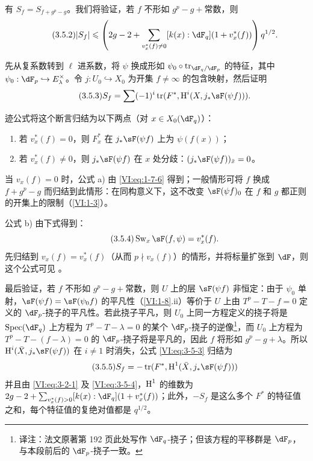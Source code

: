 有 $S_f=S_{f+g^p-g}$。我们将验证，若 $f$ 不形如 $g^p-g+\text{常数}$，则
\begin{equation*}\tag{3.5.2}\label{VI:eq:3-5-2}
  |S_f|\leqslant \left(2 g-2+\sum_{v_x^\ast(f)\ne 0} [k(x):\dF_q] (1+v_x^\ast(f))\right) q^{1/2} \text{.}
\end{equation*}

先从复系数转到 $\ell$ 进系数，将 $\psi$ 换成形如 $\psi_0\circ \tr_{\dF_q/\dF_p}$ 的特征，其中 $\psi_0:\dF_p\hookrightarrow E_\lambda^\times$。令 $j:U_0\hookrightarrow X_0$ 为开集 $f\ne\infty$ 的包含映射，然后证明
\begin{equation*}\tag{3.5.3}\label{VI:eq:3-5-3}
  S_f = \sum (-1)^i \tr(F^\ast,\h^i(X,j_\ast \sF(\psi f))) \text{.}
\end{equation*}

迹公式将这个断言归结为以下两点（对 $x\in X_0(\dF_q)$）：
\begin{enumerate}[\indent a)]
  \item 若 $v_x^\ast(f)=0$，则 $F_x^\ast$ 在 $j_\ast \sF(\psi f)$ 上为 $\psi(f(x))$；
  \item 若 $v_x^\ast(f)\ne 0$，则 $j_\ast \sF(\psi f)$ 在 $x$ 处分歧：$(j_\ast \sF(\psi f))_{\bar x}=0$。
\end{enumerate}

当 $v_x(f)=0$ 时，公式 a) 由 \eqref{VI:eq:1-7-6} 得到；一般情形可将 $f$ 换成 $f+g^p-g$ 而归结到此情形：在同构意义下，这不改变 $\sF(\psi f)_0$ 在 $f$ 和 $g$ 都正则的开集上的限制（\ref{VI:1-3}）。

公式 b) 由下式得到：
\begin{equation*}\tag{3.5.4}\label{VI:eq:3-5-4}
  \swan_x \sF(f,\psi) = v_x^\ast(f) \text{.}
\end{equation*}
先归结到 $v_x(f)=v_x^\ast(f)$（从而 $p\nmid v_x(f)$）的情形，并将标量扩张到 $\dF$，则这个公式可见 \cite[4.4]{se61}。

最后验证，若 $f$ 不形如 $g^p-g+\text{常数}$，则 $U$ 上的层 $\sF(\psi f)$ 非恒定：由于 $\psi_0$ 单射，$\sF(\psi f)=\sF(\psi_0 f)$ 的平凡性（\ref{VI:1-8}.ii）等价于 $U$ 上由 $T^p-T-f=0$ 定义的 $\dF_p$-挠子的平凡性。若此挠子平凡，则 $U_0$ 上同一方程定义的挠子将是 $\spec(\dF_q)$ 上方程为 $T^p-T-\lambda=0$ 的某个 $\dF_p$-挠子的逆像\footnote{译注：法文原著第 192 页此处写作 $\dF_q$-挠子；但该方程的平移群是 $\dF_p$，与本段前后的 $\dF_p$-挠子一致。}，而 $U_0$ 上方程为 $T^p-T-(f-\lambda)=0$ 的 $\dF_p$-挠子将是平凡的，因此 $f$ 将形如 $g^p-g+\lambda$。所以 $\h^i(\bar X,j_\ast \sF(\psi f))$ 在 $i\ne 1$ 时消失，公式 \eqref{VI:eq:3-5-3} 归结为
\begin{equation*}\tag{3.5.5}\label{VI:eq:3-5-5}
  S_f = -\tr(F^\ast,\h^1(\bar X,j_\ast \sF(\psi f)))
\end{equation*}
并且由 \eqref{VI:eq:3-2-1} 及 \eqref{VI:eq:3-5-4}，$\operatorname{H}^1$ 的维数为 $2 g-2+\sum_{v_x^\ast(f)>0} [k(x):\dF_q](1+v_x^\ast(f))$；此外，$-S_f$ 是这么多个 $F^\ast$ 的特征值之和，每个特征值的复绝对值都是 $q^{1/2}$。

